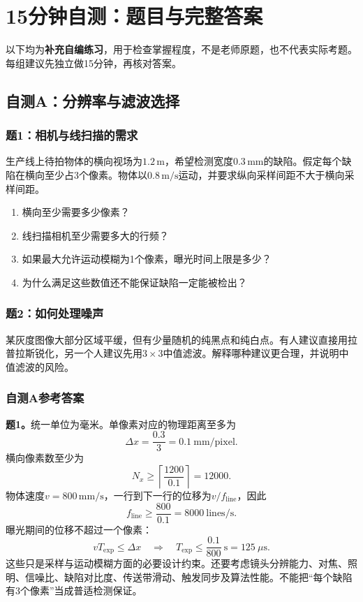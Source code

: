 \clearpage
\section{15分钟自测：题目与完整答案}
以下均为\textbf{补充自编练习}，用于检查掌握程度，不是老师原题，也不代表实际考题。每组建议先独立做15分钟，再核对答案。
\subsection{自测A：分辨率与滤波选择}
\subsubsection*{题1：相机与线扫描的需求}
生产线上待拍物体的横向视场为$1.2\,\mathrm{m}$，希望检测宽度$0.3\,\mathrm{mm}$的缺陷。假定每个缺陷在横向至少占3个像素。物体以$0.8\,\mathrm{m/s}$运动，并要求纵向采样间距不大于横向采样间距。
\begin{enumerate}
\item 横向至少需要多少像素？
\item 线扫描相机至少需要多大的行频？
\item 如果最大允许运动模糊为1个像素，曝光时间上限是多少？
\item 为什么满足这些数值还不能保证缺陷一定能被检出？
\end{enumerate}
\subsubsection*{题2：如何处理噪声}
某灰度图像大部分区域平缓，但有少量随机的纯黑点和纯白点。有人建议直接用拉普拉斯锐化，另一个人建议先用$3\times3$中值滤波。解释哪种建议更合理，并说明中值滤波的风险。
\subsubsection*{自测A参考答案}
\textbf{题1。}统一单位为毫米。单像素对应的物理距离至多为
\[
\Delta x=\frac{0.3}{3}=0.1\ \mathrm{mm/pixel}.
\]
横向像素数至少为
\[
N_x\ge\left\lceil\frac{1200}{0.1}\right\rceil=12000.
\]
物体速度$v=800\,\mathrm{mm/s}$，一行到下一行的位移为$v/f_{\mathrm{line}}$，因此
\[
f_{\mathrm{line}}\ge\frac{800}{0.1}=8000\ \mathrm{lines/s}.
\]
曝光期间的位移不超过一个像素：
\[
vT_{\mathrm{exp}}\le\Delta x
\quad\Rightarrow\quad
T_{\mathrm{exp}}\le\frac{0.1}{800}\ \mathrm{s}=125\ \mu\mathrm{s}.
\]
这些只是采样与运动模糊方面的必要设计约束。还要考虑镜头分辨能力、对焦、照明、信噪比、缺陷对比度、传送带滑动、触发同步及算法性能。不能把“每个缺陷有3个像素”当成普适检测保证。


